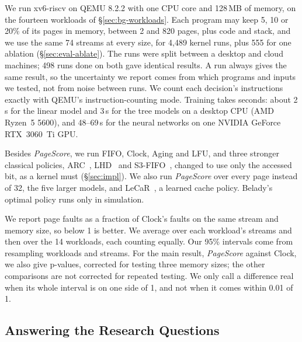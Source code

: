 \documentclass{article}
\newcommand{\xv}{xv6-riscv\xspace}
\newcommand{\clock}{Clock\xspace}
\newcommand{\belady}{Belady\xspace}
\DeclareRobustCommand{\pagescore}{\textit{PageScore}}
\begin{document}
We run \xv on QEMU 8.2.2 with one CPU core and 128\,MB of memory, on the fourteen workloads of \S\ref{sec:bg-workloads}. Each program may keep 5, 10 or 20\% of its pages in memory, between 2 and 820 pages, plus code and stack, and we use the same 74 streams at every size, for 4,489 kernel runs, plus 555 for one ablation (\S\ref{sec:eval-ablate}). The runs were split between a desktop and cloud machines; 498 runs done on both gave identical results. A run always gives the same result, so the uncertainty we report comes from which programs and inputs we tested, not from noise between runs. We count each decision's instructions exactly with QEMU's instruction-counting mode. Training takes seconds: about 2\,s for the linear model and 3\,s for the tree models on a desktop CPU (AMD Ryzen~5 5600), and 48--69\,s for the neural networks on one NVIDIA GeForce RTX~3060~Ti GPU.

Besides \pagescore{}, we run FIFO, \clock, Aging and LFU, and three stronger classical policies, ARC~\citep{megiddo2003arc}, LHD~\citep{beckmann2018lhd} and S3-FIFO~\citep{yang2023s3fifo}, changed to use only the accessed bit, as a kernel must (\S\ref{sec:impl}). We also run \pagescore{} over every page instead of 32, the five larger models, and LeCaR~\citep{vietri2018lecar}, a learned cache policy. \belady's optimal policy runs only in simulation.

We report page faults as a fraction of \clock's faults on the same stream and memory size, so below 1 is better. We average over each workload's streams and then over the 14 workloads, each counting equally. Our 95\% intervals come from resampling workloads and streams. For the main result, \pagescore{} against \clock, we also give p-values, corrected for testing three memory sizes; the other comparisons are not corrected for repeated testing. We only call a difference real when its whole interval is on one side of 1, and not when it comes within 0.01 of 1.

\subsection{Answering the Research Questions}
\label{sec:eval-results}
\end{document}
